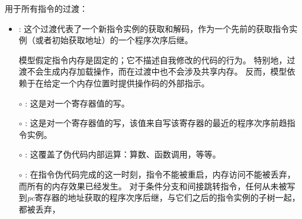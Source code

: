 \noindent 用于所有指令的过渡：
\begin{itemize}
\item {}: 这个过渡代表了一个新指令实例的获取和解码，作为一个先前的获取指令实例（或者初始获取地址）的一个程序次序后继。

模型假定指令内存是固定的；它不描述自我修改的代码的行为。
特别地，过渡不会生成内存加载操作，而在过渡中也不会涉及共享内存。
反而，模型依赖于在给定一个内存位置时提供操作码的外部指示。
%


\item[$\circ$] : 这是对一个寄存器值的写。
\item[$\circ$] : 这是对一个寄存器值的写，该值来自写该寄存器的最近的程序次序前趋指令实例。
\item[$\circ$] : 这覆盖了伪代码内部运算：算数、函数调用，等等。
\item[$\circ$] : 在指令伪代码完成的这一时刻，指令不能被重启，内存访问不能被丢弃，而所有的内存效果已经发生。
对于条件分支和间接跳转指令，任何从未被写到{\em pc}寄存器的地址获取的程序次序后继，与它们之后的指令实例的子树一起，都被丢弃，
\end{itemize}

